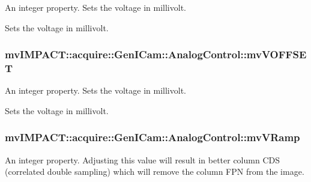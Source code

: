 An integer property. Sets the voltage in millivolt. 

Sets the voltage in millivolt. \hypertarget{classmv_i_m_p_a_c_t_1_1acquire_1_1_gen_i_cam_1_1_analog_control_a2021d735e61f95822e2479d920c6efbf}{
\subsubsection[{mv\+V\+O\+F\+F\+S\+E\+T}]{ mv\+I\+M\+P\+A\+C\+T\+::acquire\+::\+Gen\+I\+Cam\+::\+Analog\+Control\+::mv\+V\+O\+F\+F\+S\+E\+T}}\label{classmv_i_m_p_a_c_t_1_1acquire_1_1_gen_i_cam_1_1_analog_control_a2021d735e61f95822e2479d920c6efbf}


An integer property. Sets the voltage in millivolt. 

Sets the voltage in millivolt. \hypertarget{classmv_i_m_p_a_c_t_1_1acquire_1_1_gen_i_cam_1_1_analog_control_a5a2928716fc2c625c25536c7df8c9f6d}{
\subsubsection[{mv\+V\+Ramp}]{ mv\+I\+M\+P\+A\+C\+T\+::acquire\+::\+Gen\+I\+Cam\+::\+Analog\+Control\+::mv\+V\+Ramp}}\label{classmv_i_m_p_a_c_t_1_1acquire_1_1_gen_i_cam_1_1_analog_control_a5a2928716fc2c625c25536c7df8c9f6d}


An integer property. Adjusting this value will result in better column C\+D\+S (correlated double sampling) which will remove the column F\+P\+N from the image. 

